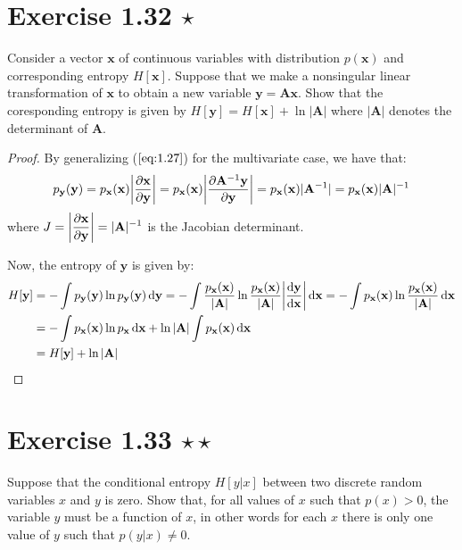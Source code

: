 \section*{Exercise 1.32 $\star$}
Consider a vector $\mathbf{x}$ of continuous variables with distribution
$p(\mathbf{x})$ and corresponding entropy $H[\mathbf{x}]$. Suppose
that we make a nonsingular linear transformation of $\mathbf{x}$ to
obtain a new variable $\mathbf{y} = \mathbf{Ax}$. Show that the coresponding
entropy is given by $H[\mathbf{y}] = H[\mathbf{x}] + \ln |\mathbf{A}|$ 
where $|\mathbf{A}|$ denotes the determinant of $\mathbf{A}$.

\begin{proof}
    By generalizing ($\ref{eq:1.27}$) for the multivariate case,
    we have that:
    \[
        p_\mathbf{y}(\mathbf{y}) 
        = p_\mathbf{x}(\mathbf{x}) \bigg|\pdv{\mathbf{x}}{\mathbf{y}}\bigg|
        = p_\mathbf{x}(\mathbf{x}) \bigg|\pdv{\mathbf{A}^{-1} \mathbf{y}}{\mathbf{y}}\bigg|
        = p_\mathbf{x}(\mathbf{x}) |\mathbf{A}^{-1}|
        = p_\mathbf{x}(\mathbf{x}) |\mathbf{A}|^{-1}
    \] 
    where $J = \displaystyle\bigg|\pdv{\mathbf{x}}{\mathbf{y}}\bigg| = |\mathbf{A}|^{-1}$ 
    is the Jacobian determinant.
    
    Now, the entropy of $\mathbf{y}$ is given by:
    \begin{align*}
        H[\mathbf{y}] 
        &= -\int p_\mathbf{y}(\mathbf{y}) \ln p_\mathbf{y}(\mathbf{y}) \mathop{}\!\mathrm{d} \mathbf{y}
        = -\int \frac{p_\mathbf{x}(\mathbf{x})}{|\mathbf{A}|} 
        \ln \frac{p_\mathbf{x}(\mathbf{x})}{|\mathbf{A}|} \bigg| \frac{\mathrm{d}\mathbf{y}}{\mathrm{d}\mathbf{x}}\bigg| \mathop{}\!\mathrm{d} \mathbf{x}
        = -\int p_{\mathbf{x}}(\mathbf{x})
        \ln \frac{p_\mathbf{x}(\mathbf{x})}{|\mathbf{A}|} \mathop{}\!\mathrm{d} \mathbf{x} \\
        &= -\int p_\mathbf{x}(\mathbf{x}) \ln p_\mathbf{x} \mathop{}\!\mathrm{d} \mathbf{x} 
        + \ln |\mathbf{A}| \int p_\mathbf{x}(\mathbf{x}) \mathop{}\!\mathrm{d} \mathbf{x} \\
        &= H[\mathbf{y}] + \ln |\mathbf{A}|
    \end{align*}
\end{proof}

\section*{Exercise 1.33 $\star \star$}
Suppose that the conditional entropy $H[y | x]$ between
two discrete random variables $x$ and $y$ is zero. Show that,
for all  values of $x$ such that $p(x) > 0$, the variable $y$ 
must be a function of $x$, in other words for each $x$ there is
only one value of $y$ such that $p(y | x) \neq 0$.

